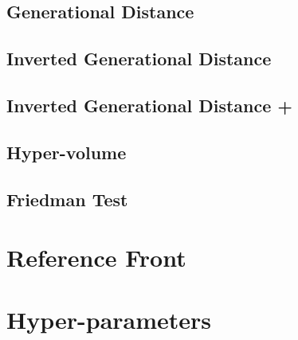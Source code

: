 \subsection{Generational Distance}
\subsection{Inverted Generational Distance}
\subsection{Inverted Generational Distance +}
\subsection{Hyper-volume}
\subsection{Friedman Test}

\section{Reference Front}

\section{Hyper-parameters}

